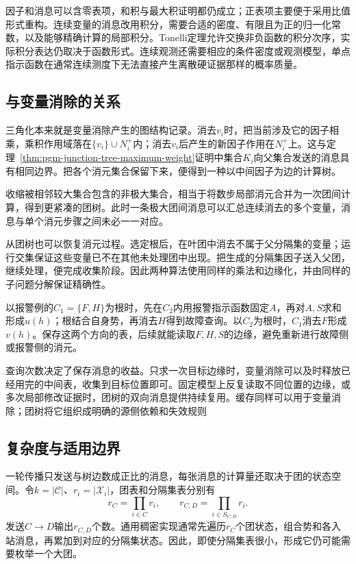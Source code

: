 因子和消息可以含零表项，和积与最大积证明都仍成立；正表项主要便于采用比值形式重构。连续变量的消息改用积分，需要合适的密度、有限且为正的归一化常数，以及能够精确计算的局部积分。Tonelli定理允许交换非负函数的积分次序，实际积分表达仍取决于函数形式。连续观测还需要相应的条件密度或观测模型，单点指示函数在通常连续测度下无法直接产生离散硬证据那样的概率质量。

\subsection{与变量消除的关系}
\label{sec:pgm-junction-tree-ve-relation}

三角化本来就是变量消除产生的图结构记录。消去$v_i$时，把当前涉及它的因子相乘，乘积作用域落在$\{v_i\}\cup N_i^+$内；消去$v_i$后产生的新因子作用在$N_i^+$上。这与定理~\ref{thm:pgm-junction-tree-maximum-weight}证明中集合$K_i$向父集合发送的消息具有相同边界。把各个消元集合保留下来，便得到一种以中间因子为边的计算树。

收缩被相邻较大集合包含的非极大集合，相当于将数步局部消元合并为一次团间计算，得到更紧凑的团树。此时一条极大团间消息可以汇总连续消去的多个变量，消息与单个消元步骤之间未必一一对应。

从团树也可以恢复消元过程。选定根后，在叶团中消去不属于父分隔集的变量；运行交集保证这些变量已不在其他未处理团中出现。把生成的分隔集因子送入父团，继续处理，便完成收集阶段。因此两种算法使用同样的乘法和边缘化，并由同样的子问题分解保证精确性。

以报警例的$C_1=\{F,H\}$为根时，先在$C_2$内用报警指示函数固定$A$，再对$A,S$求和形成$u(h)$；根结合自身势，再消去$H$得到故障查询。以$C_2$为根时，$C_1$消去$F$形成$v(h)$。保存这两个方向的表，后续就能读取$F,H,S$的边缘，避免重新进行故障侧或报警侧的消元。

查询次数决定了保存消息的收益。只求一次目标边缘时，变量消除可以及时释放已经用完的中间表，收集到目标位置即可。固定模型上反复读取不同位置的边缘，或多次局部修改证据时，团树的双向消息提供持续复用。缓存同样可以用于变量消除；团树将它组织成明确的源侧依赖和失效规则

\subsection{复杂度与适用边界}
\label{sec:pgm-junction-tree-complexity}

一轮传播只发送与树边数成正比的消息，每张消息的计算量还取决于团的状态空间。令$k=|\mathcal C|$、$r_i=|\mathcal X_i|$，团表和分隔集表分别有
\begin{equation}
  r_C=\prod_{i\in C}r_i,\qquad
  r_{C,D}=\prod_{i\in S_{C,D}}r_i.
  \label{eq:pgm-junction-tree-table-sizes}
\end{equation}
发送$C\to D$输出$r_{C,D}$个数。通用稠密实现通常先遍历$r_C$个团状态，组合势和各入站消息，再累加到对应的分隔集状态。因此，即使分隔集表很小，形成它仍可能需要枚举一个大团。

